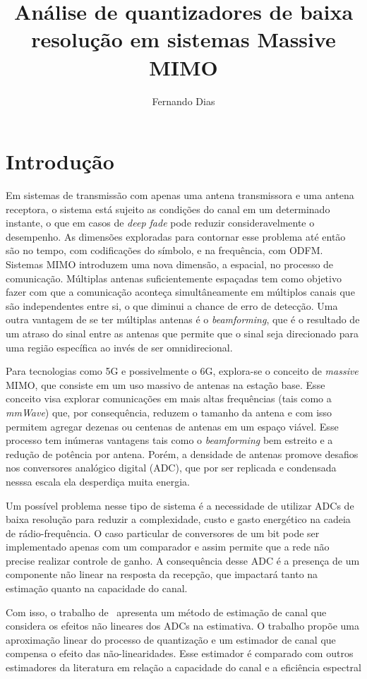 \documentclass{article}
\title{Análise de quantizadores de baixa resolução em sistemas Massive MIMO}
\author{Fernando Dias}
\date{}
\begin{document}
	\maketitle
	
	\section{Introdução}
	Em sistemas de transmissão com apenas uma antena transmissora e uma antena receptora, o sistema está sujeito as condições do canal em um determinado instante, o que em casos de \textit{deep fade} pode reduzir consideravelmente o desempenho. As dimensões exploradas para contornar esse problema até então são no tempo, com codificações do símbolo, e na frequência, com ODFM. Sistemas MIMO introduzem uma nova dimensão, a espacial, no processo de comunicação. Múltiplas antenas suficientemente espaçadas tem como objetivo fazer com que a comunicação aconteça simultâneamente em múltiplos canais que são independentes entre si, o que diminui a chance de erro de detecção. Uma outra vantagem de se ter múltiplas antenas é o \textit{beamforming}, que é o resultado de um atraso do sinal entre as antenas que permite que o sinal seja direcionado para uma região específica ao invés de ser omnidirecional.

	Para tecnologias como 5G e possivelmente o 6G, explora-se o conceito de \textit{massive} MIMO, que consiste em um uso massivo de antenas na estação base. Esse conceito visa explorar comunicações em mais altas frequências (tais como a \textit{mmWave}) que, por consequência, reduzem o tamanho da antena e com isso permitem agregar dezenas ou centenas de antenas em um espaço viável. Esse processo tem inúmeras vantagens tais como o \textit{beamforming} bem estreito e a redução de potência por antena. Porém, a densidade de antenas promove desafios nos conversores analógico digital (ADC), que por ser replicada e condensada nesssa escala ela desperdiça muita energia. 

	Um possível problema nesse tipo de sistema é a necessidade de utilizar ADCs de baixa resolução para reduzir a complexidade, custo e gasto energético na cadeia de rádio-frequência. O caso particular de conversores de um bit pode ser implementado apenas com um comparador e assim permite que a rede não precise realizar controle de ganho. A consequência desse ADC é a presença de um componente não linear na resposta da recepção, que impactará tanto na estimação quanto na capacidade do canal.

	Com isso, o trabalho de~\cite{li.etal_2017a} apresenta um método de estimação de canal que considera os efeitos não lineares dos ADCs na estimativa. O trabalho propõe uma aproximação linear do processo de quantização e um estimador de canal que compensa o efeito das não-linearidades. Esse estimador é comparado com outros estimadores da literatura em relação a capacidade do canal e a eficiência espectral
\end{document}
